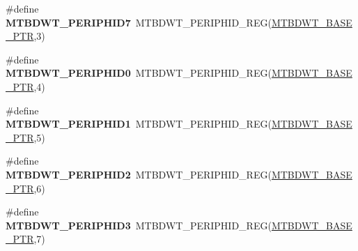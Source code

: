 \begin{DoxyCompactItemize}
\mbox{\label{group___m_t_b_d_w_t___register___accessor___macros_ga6f2e5a20f256ee541d4adc833f8d00ed}} 
\#define {\bfseries M\+T\+B\+D\+W\+T\+\_\+\+P\+E\+R\+I\+P\+H\+I\+D7}~M\+T\+B\+D\+W\+T\+\_\+\+P\+E\+R\+I\+P\+H\+I\+D\+\_\+\+R\+EG(\hyperlink{group___m_t_b_d_w_t___peripheral_ga97d048bfb5a11293a38c444b8347ff42}{M\+T\+B\+D\+W\+T\+\_\+\+B\+A\+S\+E\+\_\+\+P\+TR},3)
\item 
\mbox{\label{group___m_t_b_d_w_t___register___accessor___macros_ga07083686c100d0c9d3690d13bf1e6283}} 
\#define {\bfseries M\+T\+B\+D\+W\+T\+\_\+\+P\+E\+R\+I\+P\+H\+I\+D0}~M\+T\+B\+D\+W\+T\+\_\+\+P\+E\+R\+I\+P\+H\+I\+D\+\_\+\+R\+EG(\hyperlink{group___m_t_b_d_w_t___peripheral_ga97d048bfb5a11293a38c444b8347ff42}{M\+T\+B\+D\+W\+T\+\_\+\+B\+A\+S\+E\+\_\+\+P\+TR},4)
\item 
\mbox{\label{group___m_t_b_d_w_t___register___accessor___macros_ga9e516a8106ad8dbb2c338a2727a6b309}} 
\#define {\bfseries M\+T\+B\+D\+W\+T\+\_\+\+P\+E\+R\+I\+P\+H\+I\+D1}~M\+T\+B\+D\+W\+T\+\_\+\+P\+E\+R\+I\+P\+H\+I\+D\+\_\+\+R\+EG(\hyperlink{group___m_t_b_d_w_t___peripheral_ga97d048bfb5a11293a38c444b8347ff42}{M\+T\+B\+D\+W\+T\+\_\+\+B\+A\+S\+E\+\_\+\+P\+TR},5)
\item 
\mbox{\label{group___m_t_b_d_w_t___register___accessor___macros_ga823bbdb0a6008b9e4be7ff1646a8ec41}} 
\#define {\bfseries M\+T\+B\+D\+W\+T\+\_\+\+P\+E\+R\+I\+P\+H\+I\+D2}~M\+T\+B\+D\+W\+T\+\_\+\+P\+E\+R\+I\+P\+H\+I\+D\+\_\+\+R\+EG(\hyperlink{group___m_t_b_d_w_t___peripheral_ga97d048bfb5a11293a38c444b8347ff42}{M\+T\+B\+D\+W\+T\+\_\+\+B\+A\+S\+E\+\_\+\+P\+TR},6)
\item 
\mbox{\label{group___m_t_b_d_w_t___register___accessor___macros_ga6496ee3e7267206af1ef1f6118c0bbcf}} 
\#define {\bfseries M\+T\+B\+D\+W\+T\+\_\+\+P\+E\+R\+I\+P\+H\+I\+D3}~M\+T\+B\+D\+W\+T\+\_\+\+P\+E\+R\+I\+P\+H\+I\+D\+\_\+\+R\+EG(\hyperlink{group___m_t_b_d_w_t___peripheral_ga97d048bfb5a11293a38c444b8347ff42}{M\+T\+B\+D\+W\+T\+\_\+\+B\+A\+S\+E\+\_\+\+P\+TR},7)
\item 
\mbox{\label{group___m_t_b_d_w_t___register___accessor___macros_gabea41b046757f76e965573ba1205b5b2}} 

\end{DoxyCompactItemize}
